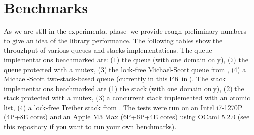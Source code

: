 \documentclass[a4paper, 11pt]{article}
\begin{document}
% 
\section{Benchmarks}\label{sec:benchmarks}



As we are still in the experimental phase, we provide rough preliminary numbers to give an idea of the library performance. The following tables show the throughput of various queues and stacks implementations. The queue implementations benchmarked are:
(1) the \Stdlib queue (with one domain only),
(2) the \Stdlib queue protected with a mutex,
(3) the lock-free Michael-Scott queue from \Saturn,
(4) a Michael-Scott two-stack-based queue (currently in this \href{https://github.com/ocaml-multicore/saturn/pull/112}{PR} in \Saturn).
The stack implementations benchmarked are
(1) the \Stdlib stack (with one domain only),
(2) the \Stdlib stack protected with a mutex,
(3) a concurrent stack implemented with an atomic list,
(4) a lock-free Treiber stack from \Saturn.
The tests were run on an Intel i7-1270P (4P+8E cores) and an Apple M3 Max (6P+6P+4E cores) using OCaml 5.2.0 (see this \href{https://github.com/lyrm/saturn_benchmarks}{repository} if you want to run your own benchmarks).
\end{document}

